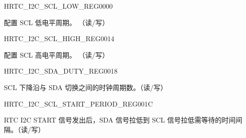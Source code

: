 \begin{register}{H}{RTC\_I2C\_SCL\_LOW\_REG}{\hexprefix{}0000}\label{regdesc:RTCI2CSCLLOWREG}
%
%
\regnewline%
\begin{regdesc}\begin{reglist}
\label{fielddesc:RTCI2CSCLLOWPERIODREG}\item [RTC\_I2C\_SCL\_LOW\_PERIOD\_REG] 配置 SCL 低电平周期。 （读/写）
\end{reglist}\end{regdesc}
\end{register}


\begin{register}{H}{RTC\_I2C\_SCL\_HIGH\_REG}{\hexprefix{}0014}\label{regdesc:RTCI2CSCLHIGHREG}
%
%
\regnewline%
\begin{regdesc}\begin{reglist}
\label{fielddesc:RTCI2CSCLHIGHPERIODREG}\item [RTC\_I2C\_SCL\_HIGH\_PERIOD\_REG] 配置 SCL 高电平周期。 （读/写）
\end{reglist}\end{regdesc}
\end{register}

\begin{register}{H}{RTC\_I2C\_SDA\_DUTY\_REG}{\hexprefix{}0018}\label{regdesc:RTCI2CSDADUTYREG}
%
%
\regnewline%
\begin{regdesc}\begin{reglist}
\label{fielddesc:RTCI2CSDADUTYNUM}\item [RTC\_I2C\_SDA\_DUTY\_NUM] SCL 下降沿与 SDA 切换之间的时钟周期数。（读/写）
\end{reglist}\end{regdesc}
\end{register}


\begin{register}{H}{RTC\_I2C\_SCL\_START\_PERIOD\_REG}{\hexprefix{}001C}\label{regdesc:RTCI2CSCLSTARTPERIODREG}
%
%
\regnewline%
\begin{regdesc}\begin{reglist}
\label{fielddesc:RTCI2CSCLSTARTPERIOD}\item [RTC\_I2C\_SCL\_START\_PERIOD] RTC I2C START 信号发出后，SDA 信号拉低到 SCL 信号拉低需等待的时间间隔。（读/写）
\end{reglist}\end{regdesc}
\end{register}


